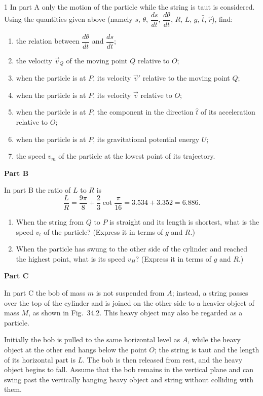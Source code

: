 \begin{problem}{1}
In part A only the motion of the particle while the string is taut is considered. Using the quantities given above (namely $s$, $\theta$, $\dfrac{ds}{dt}$, $\dfrac{d\theta}{dt}$, $R$, $L$, $g$, $\hat{t}$, $\hat{r}$), find:

\begin{enumerate}[label=(\alph*),leftmargin=2.2em,itemsep=1pt]
\item the relation between $\dfrac{d\theta}{dt}$ and $\dfrac{ds}{dt}$;
\item the velocity $\vec{v}_Q$ of the moving point $Q$ relative to $O$;
\item when the particle is at $P$, its velocity $\vec{v}'$ relative to the moving point $Q$;
\item when the particle is at $P$, its velocity $\vec{v}$ relative to $O$;
\item when the particle is at $P$, the component in the direction $\hat{t}$ of its acceleration relative to $O$;
\item when the particle is at $P$, its gravitational potential energy $U$;
\item the speed $v_m$ of the particle at the lowest point of its trajectory.
\end{enumerate}

\textbf{Part B}

In part B the ratio of $L$ to $R$ is
\[
\frac{L}{R}=\frac{9\pi}{8}+\frac{2}{3}\cot\frac{\pi}{16}=3.534+3.352=6.886 .
\]

\begin{enumerate}[label=(\alph*),leftmargin=2.2em,itemsep=1pt,start=8]
\item When the string from $Q$ to $P$ is straight and its length is shortest, what is the speed $v_t$ of the particle? (Express it in terms of $g$ and $R$.)
\item When the particle has swung to the other side of the cylinder and reached the highest point, what is its speed $v_H$? (Express it in terms of $g$ and $R$.)
\end{enumerate}

\textbf{Part C}

In part C the bob of mass $m$ is not suspended from $A$; instead, a string passes over the top of the cylinder and is joined on the other side to a heavier object of mass $M$, as shown in Fig.~34.2. This heavy object may also be regarded as a particle.

Initially the bob is pulled to the same horizontal level as $A$, while the heavy object at the other end hangs below the point $O$; the string is taut and the length of its horizontal part is $L$. The bob is then released from rest, and the heavy object begins to fall. Assume that the bob remains in the vertical plane and can swing past the vertically hanging heavy object and string without colliding with them.


\end{problem}
